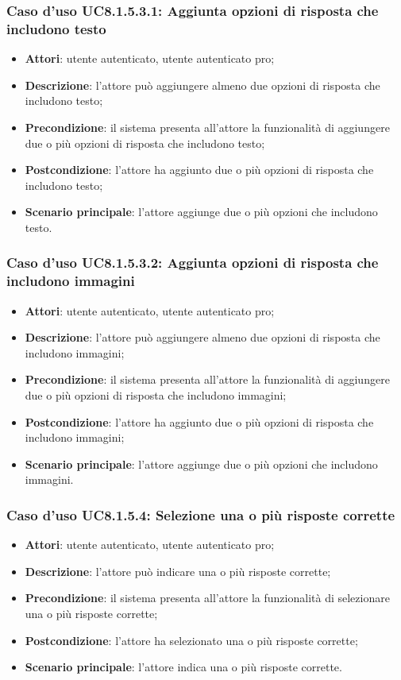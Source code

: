 \subsubsection{Caso d'uso UC8.1.5.3.1: Aggiunta opzioni di risposta che includono testo}
	\begin{itemize}
		\item
			\textbf{Attori}: utente autenticato, utente autenticato pro;
		\item		
			\textbf{Descrizione}: l'attore può aggiungere almeno due opzioni di risposta che includono testo;
		\item
			\textbf{Precondizione}: il sistema presenta all'attore la funzionalità di aggiungere due o più opzioni di risposta che includono testo;
		\item
			\textbf{Postcondizione}: l'attore ha aggiunto due o più opzioni di risposta che includono testo;
		\item
			\textbf{Scenario principale}: l'attore aggiunge due o più opzioni che includono testo.				
	\end{itemize}	

\subsubsection{Caso d'uso UC8.1.5.3.2: Aggiunta opzioni di risposta che includono immagini}
	\begin{itemize}
		\item
			\textbf{Attori}: utente autenticato, utente autenticato pro;
		\item		
			\textbf{Descrizione}: l'attore può aggiungere almeno due opzioni di risposta che includono immagini;
		\item
			\textbf{Precondizione}: il sistema presenta all'attore la funzionalità di aggiungere due o più opzioni di risposta che includono immagini;
		\item
			\textbf{Postcondizione}: l'attore ha aggiunto due o più opzioni di risposta che includono immagini;
		\item
			\textbf{Scenario principale}: l'attore aggiunge due o più opzioni che includono immagini. 				
	\end{itemize}	
		
\subsubsection{Caso d'uso UC8.1.5.4: Selezione una o più risposte corrette}
	\begin{itemize}
		\item
			\textbf{Attori}: utente autenticato, utente autenticato pro;
		\item		
			\textbf{Descrizione}: l'attore può indicare una o più risposte corrette;
		\item
			\textbf{Precondizione}: il sistema presenta all'attore la funzionalità di selezionare una o più risposte corrette;
		\item
			\textbf{Postcondizione}: l'attore ha selezionato una o più risposte corrette;
		\item
			\textbf{Scenario principale}: l'attore indica una o più risposte corrette. 			
	\end{itemize}